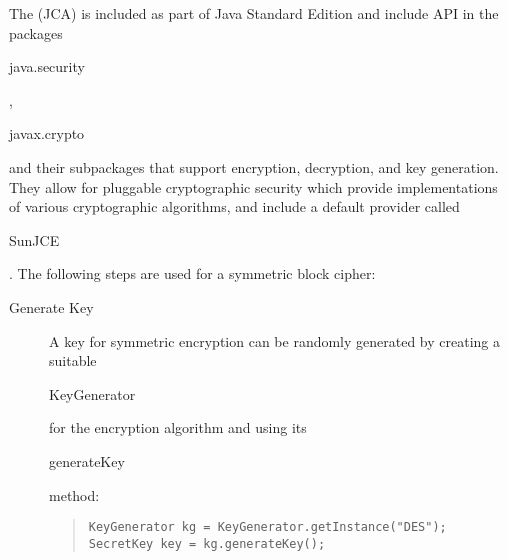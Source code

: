 The  (JCA) is included as part of Java Standard
Edition and include API in the packages \begin{code}java.security\end{code},
\begin{code}javax.crypto\end{code} and their subpackages
that support encryption, decryption, and key generation.
They allow for pluggable cryptographic security  which provide
implementations of various cryptographic algorithms, and include
a default provider called \begin{code}SunJCE\end{code}.
The following steps are used for a symmetric block cipher:
\begin{description}
  \item[Generate Key]
  A key for symmetric encryption can be randomly generated by creating a suitable
  \begin{code}KeyGenerator\end{code} for the encryption algorithm
  and using its \begin{code}generateKey\end{code} method:
\begin{quote}\begin{code}\begin{verbatim}
KeyGenerator kg = KeyGenerator.getInstance("DES");
SecretKey key = kg.generateKey();
\end{verbatim}\end{code}\end{quote}


\end{description}
